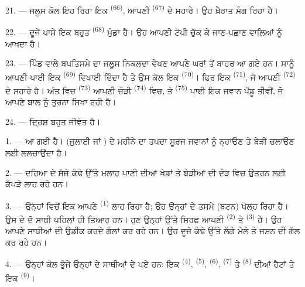 \VUsaut{4.6mm}
\VUsaut{3.4mm}

21. --- ਜਲੂਸ ਕੋਲ ਇਹ ਰਿਹਾ ਇਕ  \textsuperscript{(66)}, ਆਪਣੀ
 \textsuperscript{(67)} ਦੇ ਸਹਾਰੇ। ਉਹ ਖ਼ੈਰਾਤ ਮੰਗ ਰਿਹਾ ਹੈ।

22. --- ਦੂਜੇ ਪਾਸੇ ਇਕ ਬਹੁਤ  \textsuperscript{(68)} ਮੁੰਡਾ ਹੈ। ਉਹ ਆਪਣੀ
ਟੋਪੀ ਚੁੱਕ ਕੇ ਜਾਣ-ਪਛਾਣ ਵਾਲਿਆਂ ਨੂੰ  ਆਖਦਾ ਹੈ।

23. --- ਪਿੰਡ ਵਾਲੇ ਬਪਤਿਸਮੇ ਦਾ ਜਲੂਸ ਨਿਕਲਦਾ ਵੇਖਣ ਆਪਣੇ ਘਰਾਂ ਤੋਂ ਬਾਹਰ ਆ ਗਏ ਹਨ।
ਸਾਨੂੰ ਆਪਣੀ  ਪਾਈ ਇਕ  \textsuperscript{(69)}
ਵਿਖਾਈ ਦਿੰਦਾ ਹੈ ਤੇ ਉਸ ਕੋਲ ਇਕ  \textsuperscript{(70)}। ਫਿਰ ਇਕ
 \textsuperscript{(71)}, ਜੋ ਆਪਣੀ  \textsuperscript{(72)}
ਦੇ ਸਹਾਰੇ ਹੈ। ਅੰਤ ਵਿਚ  \textsuperscript{(73)} ਆਪਣੀ ਚੌੜੀ
 \textsuperscript{(74)} ਵਿਚ, ਤੇ 
\textsuperscript{(75)} ਪਾਈ ਇਕ ਜਵਾਨ ਪੇਂਡੂ ਤੀਵੀਂ, ਜੋ ਆਪਣੇ ਬਾਲ ਨੂੰ ਤੁਰਨਾ ਸਿਖਾ ਰਹੀ
ਹੈ।

24. --- ਦ੍ਰਿਸ਼ ਬਹੁਤ ਜੀਵੰਤ ਹੈ।
\VUsaut{4.0mm}

\VUsaut{3.0mm}

\VUsaut{2.4mm}

\VUsaut{3.0mm}

1. ---  ਆ ਗਈ ਹੈ।  (ਜੁਲਾਈ ਜਾਂ ) ਦੇ ਮਹੀਨੇ
ਦਾ ਤਪਦਾ ਸੂਰਜ ਜਵਾਨਾਂ ਨੂੰ ਨ੍ਹਾਉਣ ਤੇ ਬੇੜੀ ਚਲਾਉਣ ਲਈ ਲਲਚਾਉਂਦਾ ਹੈ।

2. --- ਦਰਿਆ ਦੇ ਸੱਜੇ ਕੰਢੇ ਉੱਤੇ ਮਲਾਹ ਪਾਣੀ ਦੀਆਂ ਖੇਡਾਂ ਤੇ ਬੇੜੀਆਂ ਦੀ ਦੌੜ ਵਿਚ ਉਤਰਨ
ਲਈ ਕੱਪੜੇ ਲਾਹ ਰਹੇ ਹਨ।

3. --- ਉਨ੍ਹਾਂ ਵਿਚੋਂ ਇਕ ਆਪਣੇ  \textsuperscript{(1)} ਲਾਹ ਰਿਹਾ ਹੈ; ਉਹ
ਉਨ੍ਹਾਂ ਦੇ ਤਸਮੇ (ਬਟਨ) ਖੋਲ੍ਹ ਰਿਹਾ ਹੈ। ਉਸ ਦੇ ਦੋ ਸਾਥੀ ਪਹਿਲਾਂ ਹੀ ਤਿਆਰ ਹਨ। ਹੁਣ
ਉਨ੍ਹਾਂ ਉੱਤੇ ਸਿਰਫ਼ ਆਪਣੀ  \textsuperscript{(2)} ਤੇ
 \textsuperscript{(3)} ਹੈ। ਉਹ ਆਪਣੇ ਸਾਥੀਆਂ ਦੀ ਉਡੀਕ ਕਰਦੇ
ਗੱਲਾਂ ਕਰ ਰਹੇ ਹਨ। ਉਹ ਦੂਜੇ ਕੰਢੇ ਉੱਤੇ ਲੱਗੇ ਮੇਲੇ ਤੇ ਜਸ਼ਨ ਦੀ ਗੱਲ ਕਰ ਰਹੇ ਹਨ।

4. --- ਉਨ੍ਹਾਂ ਕੋਲ ਭੁੰਜੇ ਉਨ੍ਹਾਂ ਦੇ ਸਾਥੀਆਂ ਦੇ  ਪਏ ਹਨ: ਇਕ
  \textsuperscript{(4)}, 
\textsuperscript{(5)},  \textsuperscript{(6)}, 
\textsuperscript{(7)} ਤੇ  \textsuperscript{(8)} ਦੀਆਂ ਹੈਟਾਂ ਤੇ ਇਕ
 \textsuperscript{(9)}।

